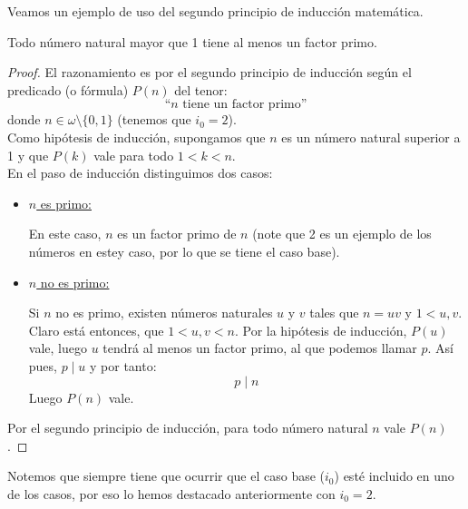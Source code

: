 Veamos un ejemplo de uso del segundo principio de inducción matemática.
\begin{ejercicio}
    Todo número natural mayor que 1 tiene al menos un factor primo.
\begin{proof}
    El razonamiento es por el segundo principio de inducción según el predicado (o fórmula) $P(n)$ del tenor:
    $$\text{``}n \text{ tiene un factor primo}\text{''}$$
    donde $n \in \omega \setminus \{ 0, 1\}$ (tenemos que $i_0 = 2$).\\

    Como hipótesis de inducción, supongamos que $n$ es un número natural superior a 1 y que $P(k)$ vale para todo $1<k < n$.\\
    En el paso de inducción distinguimos dos casos:
    \begin{itemize}
        \item \ul{$n$ es primo:} 

            En este caso, $n$ es un factor primo de $n$ (note que 2 es un ejemplo de los números en estey caso, por lo que se tiene el caso base).
        \item \ul{$n$ no es primo:}
        
            Si $n$ no es primo, existen números naturales $u$ y $v$ tales que $n = uv$ y $1<u,v$. Claro está entonces, que $1<u,v<n$. Por la hipótesis de inducción, $P(u)$ vale, luego $u$ tendrá al menos un factor primo, al que podemos llamar $p$. Así pues, $p \mid u$ y por tanto:
            $$p \mid n$$
            Luego $P(n)$ vale.
    \end{itemize}
    Por el segundo principio de inducción, para todo número natural $n$ vale $P(n)$.
\end{proof}

Notemos que siempre tiene que ocurrir que el caso base ($i_0$) esté incluido en uno de los casos, por eso lo hemos destacado anteriormente con $i_0 = 2$.
\end{ejercicio}


